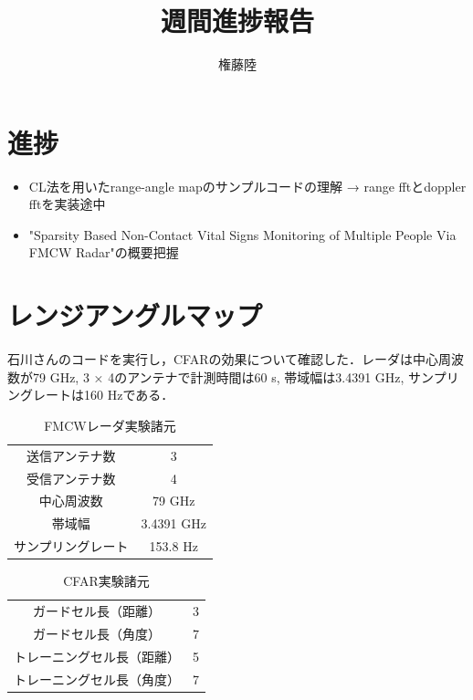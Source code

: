 \documentclass[dvipdfmx]{jsarticle}
\begin{document}
\title{週間進捗報告}
\author{権藤陸}
\maketitle
\section{進捗}
\begin{itemize}
    \item CL法を用いたrange-angle mapのサンプルコードの理解 → range fftとdoppler fftを実装途中
    \item "Sparsity Based Non-Contact Vital Signs Monitoring of Multiple People Via FMCW Radar"の概要把握 
\end{itemize}

\section{レンジアングルマップ}
石川さんのコードを実行し，CFARの効果について確認した．レーダは中心周波数が79 GHz, 3 × 4のアンテナで計測時間は60 s, 帯域幅は3.4391 GHz, サンプリングレートは160 Hzである．

\begin{table}
    \caption{FMCWレーダ実験諸元}
    \centering
    \begin{tabular}{cc}
        \hline
        送信アンテナ数 & 3 \\
        受信アンテナ数 & 4 \\
        中心周波数 & 79 GHz \\
        帯域幅 & 3.4391 GHz \\
        サンプリングレート & 153.8 Hz\\
        \hline
    \end{tabular}
\end{table}

\begin{table}
    \caption{CFAR実験諸元}
    \centering
    \begin{tabular}{cc}
        \hline
        ガードセル長（距離）& 3 \\
        ガードセル長（角度）& 7 \\
        トレーニングセル長（距離）& 5\\
        トレーニングセル長（角度）& 7 \\
        \hline
    \end{tabular}
\end{table}
\end{document}
